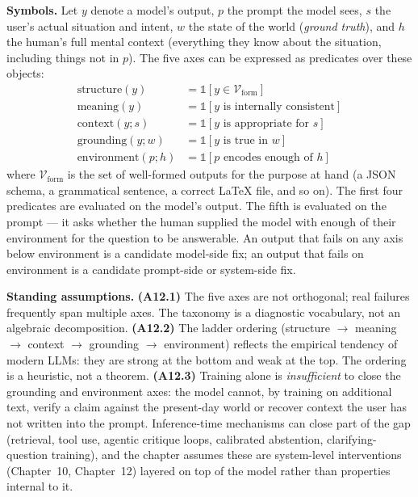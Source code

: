 \begin{notationbox}
\textbf{Symbols.}
Let $y$ denote a model's output, $p$ the prompt the model sees,
$s$ the user's actual situation and intent, $w$ the state of the
world (\emph{ground truth}), and $h$ the human's full mental
context (everything they know about the situation, including
things not in $p$). The five axes can be expressed as predicates
over these objects:
\begin{align}
  \mathrm{structure}(y) &= \mathbb{1}\!\left[y \in \mathcal{V}_{\mathrm{form}}\right] \label{eq:week12-structure}\\
  \mathrm{meaning}(y) &= \mathbb{1}\!\left[y \text{ is internally consistent}\right] \label{eq:week12-meaning}\\
  \mathrm{context}(y; s) &= \mathbb{1}\!\left[y \text{ is appropriate for } s\right] \label{eq:week12-context}\\
  \mathrm{grounding}(y; w) &= \mathbb{1}\!\left[y \text{ is true in } w\right] \label{eq:week12-grounding}\\
  \mathrm{environment}(p; h) &= \mathbb{1}\!\left[p \text{ encodes enough of } h\right] \label{eq:week12-environment}
\end{align}
where $\mathcal{V}_{\mathrm{form}}$ is the set of well-formed
outputs for the purpose at hand (a JSON schema, a grammatical
sentence, a correct LaTeX file, and so on). The first four
predicates are evaluated on the model's output. The fifth is
evaluated on the prompt --- it asks whether the human supplied the
model with enough of their environment for the question to be
answerable. An output that fails on any axis below environment is
a candidate model-side fix; an output that fails on environment is
a candidate prompt-side or system-side fix.

\textbf{Standing assumptions.}
\textbf{(A12.1)} The five axes are not orthogonal; real failures
frequently span multiple axes. The taxonomy is a diagnostic
vocabulary, not an algebraic decomposition.
\textbf{(A12.2)} The ladder ordering (structure $\to$ meaning $\to$
context $\to$ grounding $\to$ environment) reflects the empirical
tendency of modern LLMs: they are strong at the bottom and weak at
the top. The ordering is a heuristic, not a theorem.
\textbf{(A12.3)} Training alone is \emph{insufficient} to close
the grounding and environment axes: the model cannot, by training
on additional text, verify a claim against the present-day world
or recover context the user has not written into the prompt.
Inference-time mechanisms can close part of the gap (retrieval,
tool use, agentic critique loops, calibrated abstention,
clarifying-question training), and the chapter assumes these are
system-level interventions (Chapter~10, Chapter~12) layered on top
of the model rather than properties internal to it.
\end{notationbox}

